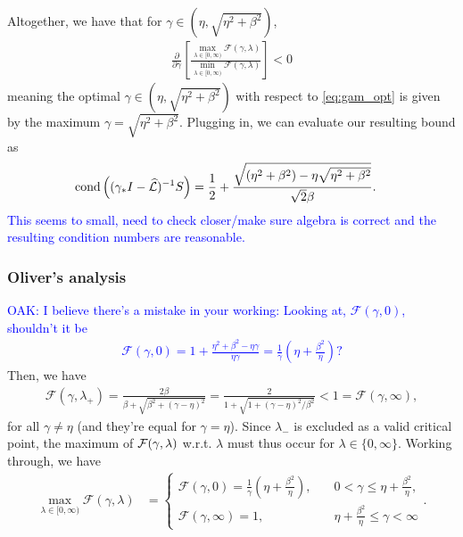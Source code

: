 \documentclass[a4paper,10pt]{article}
\newcommand{\tcb}{\textcolor{blue}}
\begin{document}
Altogether, we have that for $\gamma \in(\eta,\sqrt{\eta^2+\beta^2})$,
%
\begin{align*}
\frac{\partial}{\partial\gamma}\left[ 
	\frac{\max_{\lambda\in[0,\infty)} \mathcal{F}(\gamma,\lambda)}
	{\min_{\lambda\in[0,\infty)} \mathcal{F}(\gamma,\lambda)} \right] < 0
\end{align*}
%
meaning the optimal $\gamma \in(\eta,\sqrt{\eta^2+\beta^2})$ with respect to
\eqref{eq:gam_opt} is given by the maximum $\gamma = \sqrt{\eta^2+\beta^2}$.
Plugging in, we can evaluate our resulting bound as
%
\begin{align}\label{eq:cond_opt}
\textnormal{cond}\left((\gamma_* I- \widehat{\mathcal{L}})^{-1}S\right) & =
	\frac{1}{2} + \frac{\sqrt{(\eta^2+\beta^2) - \eta\sqrt{\eta^2+\beta^2}}}{\sqrt{2}\beta}.
\end{align}
%
\tcb{This seems to small, need to check closer/make sure algebra is correct
and the resulting condition numbers are reasonable.}


\subsubsection{Oliver's analysis}
\tcb{OAK: I believe there's a mistake in your working: Looking at, $\mathcal{F}(\gamma,0)$, shouldn't it be
\begin{align*}
\mathcal{F}(\gamma,0) = 1 + \frac{\eta^2+\beta^2-\eta \gamma}{\eta\gamma} = \frac{1}{\gamma} \left( \eta + \frac{\beta^2}{\eta} \right)?
\end{align*}}
Then, we have
\begin{align*}
\mathcal{F}(\gamma,\lambda_+) = \frac{2\beta}{\beta + \sqrt{\beta^2 + (\gamma-\eta)^2}} = \frac{2}{1 + \sqrt{1 + (\gamma-\eta)^2/\beta^2}} < 1 = \mathcal{F}(\gamma,\infty),
\end{align*}
for all $\gamma \neq \eta$ (and they're equal for $\gamma = \eta$).
%
Since $\lambda_-$ is excluded as a valid critical point, the maximum of ${\cal F}(\gamma,\lambda)$ w.r.t. $\lambda$ must thus occur for $\lambda \in \{ 0, \infty \}$. Working through, we have
\begin{align*}
\max_{\lambda\in[0,\infty)} \mathcal{F}(\gamma,\lambda) & = 
\begin{cases}
\displaystyle
\mathcal{F}(\gamma,0) 
= 
\frac{1}{\gamma} \left(\eta + \frac{\beta^2}{\eta} \right), 
\quad 
& 0 < \gamma \leq \eta +  \tfrac{\beta^2}{\eta}, \\
\displaystyle
\mathcal{F}(\gamma,\infty) 
= 
1, \quad & \eta + \tfrac{\beta^2}{\eta} \leq \gamma < \infty
\end{cases}.
\end{align*}
\end{document}

